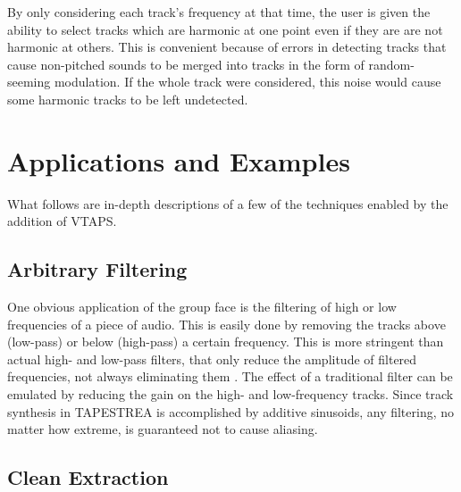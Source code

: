 \documentclass{article}
\begin{document}
By only considering each track's frequency at that time, the user is given the
ability to select tracks which are harmonic at one point even if they are are
not harmonic at others. This is convenient because of errors in detecting
tracks that cause non-pitched sounds to be merged into tracks in the form of
random-seeming modulation. If the whole track were considered, this noise would
cause some harmonic tracks to be left undetected.


\section{Applications and Examples}

What follows are in-depth descriptions of a few of the techniques enabled by
the addition of VTAPS.

\subsection{Arbitrary Filtering}

One obvious application of the group face is the filtering of high or low
frequencies of a piece of audio. This is easily done by removing the tracks
above (low-pass) or below (high-pass) a certain frequency.  This is more
stringent than actual high- and low-pass filters, that only reduce the
amplitude of filtered frequencies, not always eliminating them \cite[pg
29-31]{real}. The effect of a traditional filter can be emulated by reducing the 
gain on the high- and low-frequency tracks. Since track synthesis in TAPESTREA 
is accomplished by additive sinusoids, any filtering, no matter how extreme, is 
guaranteed not to cause aliasing. 

\subsection{Clean Extraction}

\end{document}
